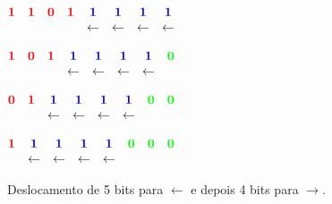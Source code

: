 \documentclass[10pt]{article}
\begin{document}
\begin{figure}[ht]
\caption{Deslocamento de 5 bits para $\leftarrow$ e depois 4 bits para $\rightarrow$.}
\label{fig_deslocamento_bits01}

\begin{center}
\begin{animateinline}[loop, poster = first, controls={play, stop, step}]{0.5}

$\begin{matrix}
	\textcolor{red}{\mathbf{1}} & 
	\textcolor{red}{\mathbf{1}} & 
	\textcolor{red}{\mathbf{0}} & 
	\textcolor{red}{\mathbf{1}} & 
	\textcolor{blue}{\mathbf{1}} &	
	\textcolor{blue}{\mathbf{1}} &
	\textcolor{blue}{\mathbf{1}} &	
	\textcolor{blue}{\mathbf{1}} \\
  &   &   &   & \leftarrow & \leftarrow & \leftarrow &\leftarrow \\
\end{matrix}$

	\newframe
$\begin{matrix}
	\textcolor{red}{\mathbf{1}} & 
	\textcolor{red}{\mathbf{0}} & 
	\textcolor{red}{\mathbf{1}} & 
	\textcolor{blue}{\mathbf{1}} &	
	\textcolor{blue}{\mathbf{1}} &
	\textcolor{blue}{\mathbf{1}} &	
	\textcolor{blue}{\mathbf{1}} &
	\textcolor{green}{\mathbf{0}} \\	
     &   &   & \leftarrow & \leftarrow & \leftarrow &\leftarrow &\\
\end{matrix}$
	\newframe

$\begin{matrix}
	\textcolor{red}{\mathbf{0}} & 
	\textcolor{red}{\mathbf{1}} & 
	\textcolor{blue}{\mathbf{1}} &	
	\textcolor{blue}{\mathbf{1}} &
	\textcolor{blue}{\mathbf{1}} &	
	\textcolor{blue}{\mathbf{1}} &
	\textcolor{green}{\mathbf{0}} & 	
	\textcolor{green}{\mathbf{0}} \\	
	  &   & \leftarrow & \leftarrow & \leftarrow & \leftarrow &   &\\
	\end{matrix}$

	\newframe
$\begin{matrix}
	\textcolor{red}{\mathbf{1}} & 
	\textcolor{blue}{\mathbf{1}} &	
	\textcolor{blue}{\mathbf{1}} &
	\textcolor{blue}{\mathbf{1}} &	
	\textcolor{blue}{\mathbf{1}} &
	\textcolor{green}{\mathbf{0}} & 	
	\textcolor{green}{\mathbf{0}} &	
	\textcolor{green}{\mathbf{0}} \\	
	  & \leftarrow & \leftarrow & \leftarrow & \leftarrow &   &   &\\ 
	\end{matrix}$


\end{animateinline}
\end{center}
\end{figure}
\end{document}
